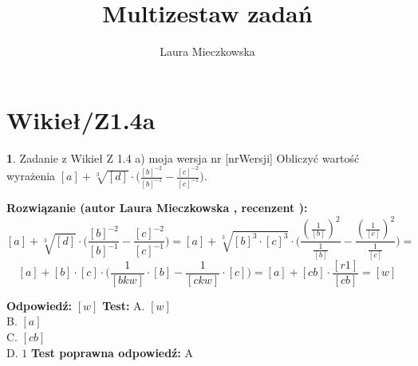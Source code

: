\documentclass[12pt, a4paper]{article}
\title{Multizestaw zadań}
\author{Laura Mieczkowska}
\date{}
\theoremstyle{definition} %
\newtheorem{zad}{}
\newcommand{\kategoria}[1]{\section{#1}} %
\newcommand{\zadStart}[1]{\begin{zad}#1\newline} %
\newcommand{\zadStop}{\end{zad}}   %
\newcommand{\rozwStart}[2]{\noindent \textbf{Rozwiązanie (autor #1 , recenzent #2): }\newline} %
\newcommand{\odpStart}{\noindent \textbf{Odpowiedź:}\newline}    %
\newcommand{\odpStop}{\newline}                                             %
\newcommand{\testStart}{\noindent \textbf{Test:}\newline} %
\newcommand{\testStop}{\newline} %
\newcommand{\kluczStart}{\noindent \textbf{Test poprawna odpowiedź:}\newline} %
\newcommand{\kluczStop}{\newline} %
\begin{document}
\maketitle


\kategoria{Wikieł/Z1.4a}
\zadStart{Zadanie z Wikieł Z 1.4 a) moja wersja nr [nrWersji]}
Obliczyć wartość wyrażenia $[a]+\sqrt[3]{[d]}\cdot \big(\frac{[b]^{-2}}{[b]^{-1}}-\frac{[c]^{-2}}{[c]^{-1}}\big)$.
\zadStop
\rozwStart{Laura Mieczkowska}{}
$$[a]+\sqrt[3]{[d]}\cdot \big(\frac{[b]^{-2}}{[b]^{-1}}-\frac{[c]^{-2}}{[c]^{-1}}\big)
=[a]+\sqrt[3]{[b]^3\cdot[c]^3}\cdot \big(\frac{(\frac{1}{[b]})^{2}}{\frac{1}{[b]}}-\frac{(\frac{1}{[c]})^{2}}{\frac{1}{[c]}}\big)=$$
$$[a]+[b]\cdot[c]\cdot\big(\frac{1}{[bkw]}\cdot[b]-\frac{1}{[ckw]}\cdot[c]\big)=[a]+[cb]\cdot\frac{[r1]}{[cb]}=[w]$$


\odpStart
$[w]$
\odpStop
\testStart
A. $[w]$ \\
B. $[a]$ \\
C. $[cb]$ \\
D. $1$ 
\testStop
\kluczStart
A
\kluczStop
\end{document}
